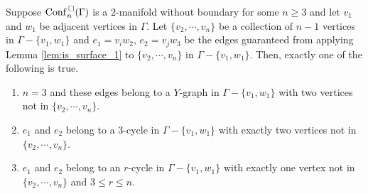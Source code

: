 \begin{lem}
    \label{lem:is_surface_2}
    Suppose \(\mathrm{Conf}^{\,\square}_n(\Gamma)\) is a \(2\)-manifold without boundary for some \(n \ge 3\) and let \(v_1\) and \(w_1\) be adjacent vertices in \(\Gamma\).
    Let \(\{v_2, \cdots, v_n\}\) be a collection of \(n-1\) vertices in \(\Gamma - \{v_1, w_1\}\) 
    and \(e_1 = v_i w_2\), \(e_2 = v_j w_3\) be the edges guaranteed
    from applying Lemma \ref{lem:is_surface_1} to \(\{v_2, \cdots, v_n\}\) in \(\Gamma - \{v_1, w_1\}\).
    Then, exactly one of the following is true.
    \begin{enumerate}
        \item \(n = 3\) and these edges belong to a \(Y\)-graph in \(\Gamma - \{v_1, w_1\}\) with two vertices not in \(\{v_2, \cdots, v_n\}\).
        \item \(e_1\) and \(e_2\) belong to a \(3\)-cycle in \(\Gamma - \{v_1, w_1\}\) with exactly two vertices not in \(\{v_2, \cdots, v_n\}\).
        \item \(e_1\) and \(e_2\) belong to an \(r\)-cycle in \(\Gamma - \{v_1, w_1\}\) with exactly one vertex not in \(\{v_2, \cdots, v_n\}\) and \(3 \le r \le n\).
    \end{enumerate}
\end{lem}
